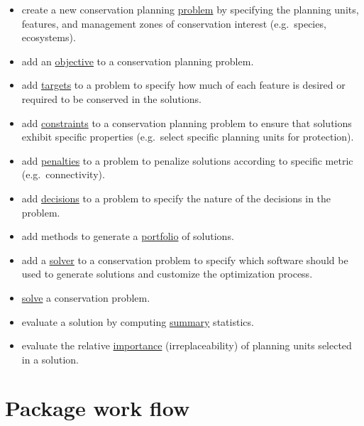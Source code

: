 \documentclass[
  12pt,
]{book}
\providecommand{\tightlist}{%
  \setlength{\itemsep}{0pt}\setlength{\parskip}{0pt}}
\begin{document}
\begin{itemize}
\tightlist
\item
  create a new conservation planning \href{https://prioritizr.net/reference/problem.html}{problem} by specifying the planning units, features, and management zones of conservation interest (e.g.~species, ecosystems).
\item
  add an \href{https://prioritizr.net/reference/objectives.html}{objective} to a conservation planning problem.
\item
  add \href{https://prioritizr.net/reference/targets.html}{targets} to a problem to specify how much of each feature is desired or required to be conserved in the solutions.
\item
  add \href{https://prioritizr.net/reference/constraints.html}{constraints} to a conservation planning problem to ensure that solutions exhibit specific properties (e.g.~select specific planning units for protection).
\item
  add \href{https://prioritizr.net/reference/penalties.html}{penalties} to a problem to penalize solutions according to specific metric (e.g.~connectivity).
\item
  add \href{https://prioritizr.net/reference/decisions.html}{decisions} to a problem to specify the nature of the decisions in the problem.
\item
  add methods to generate a \href{https://prioritizr.net/reference/portfolios.html}{portfolio} of solutions.
\item
  add a \href{https://prioritizr.net/reference/solvers.html}{solver} to a conservation problem to specify which software should be used to generate solutions and customize the optimization process.
\item
  \href{https://prioritizr.net/reference/solve.html}{solve} a conservation problem.
\item
  evaluate a solution by computing \href{https://prioritizr.net/reference/summaries.html}{summary} statistics.
\item
  evaluate the relative \href{https://prioritizr.net/reference/importance.html}{importance} (irreplaceability) of planning units selected in a solution.
\end{itemize}

\hypertarget{package-work-flow}{%
\section{Package work flow}\label{package-work-flow}}
\end{document}
